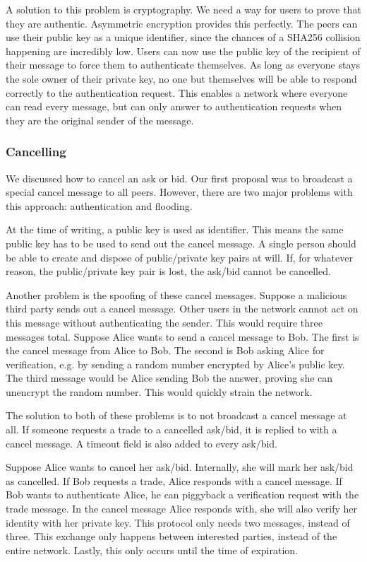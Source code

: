 \documentclass[]{article}
\begin{document}
A solution to this problem is cryptography. We need a way for users to prove that they are authentic. Asymmetric encryption provides this perfectly. The peers can use their public key as a unique identifier, since the chances of a SHA256 collision happening are incredibly low. Users can now use the public key of the recipient of their message to force them to authenticate themselves. As long as everyone stays the sole owner of their private key, no one but themselves will be able to respond correctly to the authentication request. This enables a network where everyone can read every message, but can only answer to authentication requests when they are the original sender of the message.

\subsubsection{Cancelling}
We discussed how to cancel an ask or bid. Our first proposal was to broadcast a special cancel message to all peers. However, there are two major problems with this approach: authentication and flooding.

At the time of writing, a public key is used as identifier. This means the same public key has to be used to send out the cancel message. A single person should be able to create and dispose of public/private key pairs at will. If, for whatever reason, the public/private key pair is lost, the ask/bid cannot be cancelled.

Another problem is the spoofing of these cancel messages. Suppose a malicious third party sends out a cancel message. Other users in the network cannot act on this message without authenticating the sender. This would require three messages total. Suppose Alice wants to send a cancel message to Bob. The first is the cancel message from Alice to Bob. The second is Bob asking Alice for verification, e.g. by sending a random number encrypted by Alice's public key. The third message would be Alice sending Bob the answer, proving she can unencrypt the random number. This would quickly strain the network.

The solution to both of these problems is to not broadcast a cancel message at all. If someone requests a trade to a cancelled ask/bid, it is replied to with a cancel message. A timeout field is also added to every ask/bid.

Suppose Alice wants to cancel her ask/bid. Internally, she will mark her ask/bid as cancelled. If Bob requests a trade, Alice responds with a cancel message. If Bob wants to authenticate Alice, he can piggyback a verification request with the trade message. In the cancel message Alice responds with, she will also verify her identity with her private key. This protocol only needs two messages, instead of three. This exchange only happens between interested parties, instead of the entire network. Lastly, this only occurs until the time of expiration.
\end{document}
